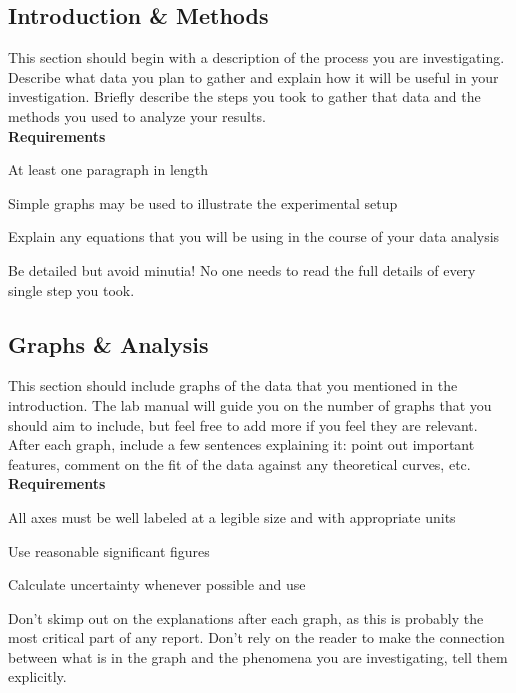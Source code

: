\subsection*{Introduction \& Methods}
This section should begin with a description of the process you are investigating.
Describe what data you plan to gather and explain how it will be useful in your investigation.
Briefly describe the steps you took to gather that data and the methods you used to analyze your results. \\
\textbf{Requirements}
\begin{list}{-}{\topsep=0pt \itemsep=0pt}
	\item At least one paragraph in length
	\item Simple graphs may be used to illustrate the experimental setup
	\item Explain any equations that you will be using in the course of your data analysis
	\item Be detailed but avoid minutia! No one needs to read the full details of every single step you took. 
\end{list}

\subsection*{Graphs \& Analysis}
This section should include graphs of the data that you mentioned in the introduction.
The lab manual will guide you on the number of graphs that you should aim to include, but feel free to add more if you feel they are relevant.
After each graph, include a few sentences explaining it: point out important features, comment on the fit of the data against any theoretical curves, etc. \\
\textbf{Requirements}
\begin{list}{-}{\topsep=0pt \itemsep=0pt}
	\item All axes must be well labeled at a legible size and with appropriate units
	\item Use reasonable significant figures
	\item Calculate uncertainty whenever possible and use 
	\item Don't skimp out on the explanations after each graph, as this is probably the most critical part of any report. Don't rely on the reader to make the connection between what is in the graph and the phenomena you are investigating, tell them explicitly.
\end{list}

